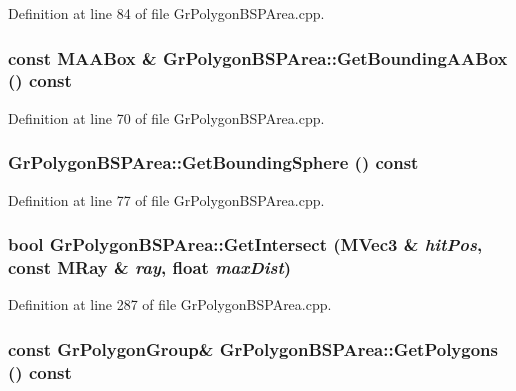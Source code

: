 Definition at line 84 of file GrPolygonBSPArea.cpp.\hypertarget{class_gr_polygon_b_s_p_area_dab93dce455697f234e10a72b57806c9}{
\subsubsection[{GetBoundingAABox}]{\setlength{\rightskip}{0pt plus 5cm}const {\bf MAABox} \& GrPolygonBSPArea::GetBoundingAABox () const}}
\label{class_gr_polygon_b_s_p_area_dab93dce455697f234e10a72b57806c9}




Definition at line 70 of file GrPolygonBSPArea.cpp.\hypertarget{class_gr_polygon_b_s_p_area_3cc8969be9caa17c5beae9ff355ea462}{
\subsubsection[{GetBoundingSphere}]{ GrPolygonBSPArea::GetBoundingSphere () const}}
\label{class_gr_polygon_b_s_p_area_3cc8969be9caa17c5beae9ff355ea462}




Definition at line 77 of file GrPolygonBSPArea.cpp.\hypertarget{class_gr_polygon_b_s_p_area_6e7ef012b866a7d4d69e8fec2aa10ff3}{
\subsubsection[{GetIntersect}]{\setlength{\rightskip}{0pt plus 5cm}bool GrPolygonBSPArea::GetIntersect ({\bf MVec3} \& {\em hitPos}, \/  const {\bf MRay} \& {\em ray}, \/  float {\em maxDist})}}
\label{class_gr_polygon_b_s_p_area_6e7ef012b866a7d4d69e8fec2aa10ff3}




Definition at line 287 of file GrPolygonBSPArea.cpp.\hypertarget{class_gr_polygon_b_s_p_area_bf71c666d5f57293255b47e577b6f757}{
\subsubsection[{GetPolygons}]{\setlength{\rightskip}{0pt plus 5cm}const {\bf GrPolygonGroup}\& GrPolygonBSPArea::GetPolygons () const}}
\label{class_gr_polygon_b_s_p_area_bf71c666d5f57293255b47e577b6f757}




